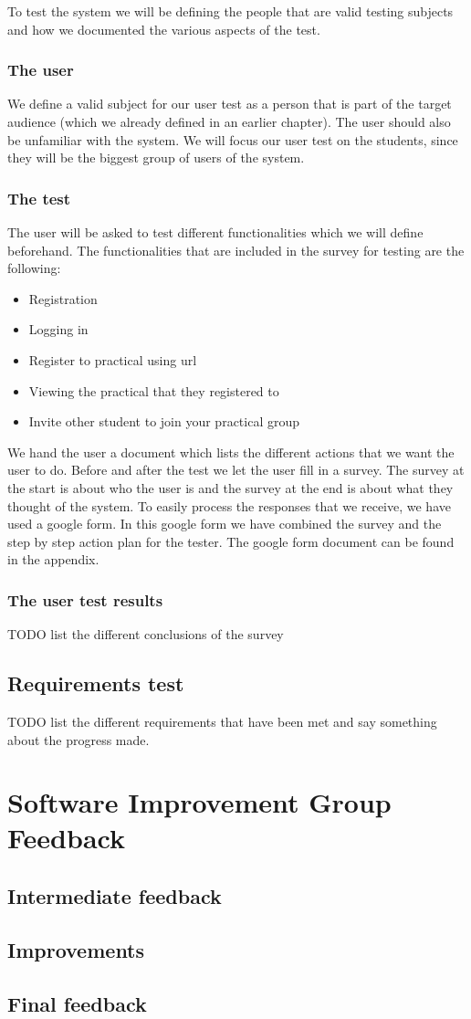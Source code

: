To test the system we will be defining the people that are valid testing subjects and how we documented the various aspects of the test.

\subsubsection{The user}
We define a valid subject for our user test as a person that is part of the target audience (which we already defined in an earlier chapter).
The user should also be unfamiliar with the system.
We will focus our user test on the students, since they will be the biggest group of users of the system.

\subsubsection{The test}
The user will be asked to test different functionalities which we will define beforehand.
The functionalities that are included in the survey for testing are the following:
\begin{itemize}
\item Registration
\item Logging in
\item Register to practical using url
\item Viewing the practical that they registered to
\item Invite other student to join your practical group
\end{itemize}
We hand the user a document which lists the different actions that we want the user to do.
Before and after the test we let the user fill in a survey.
The survey at the start is about who the user is and the survey at the end is about what they thought of the system.
To easily process the responses that we receive, we have used a google form.
In this google form we have combined the survey and the step by step action plan for the tester.
The google form document can be found in the appendix.


\subsubsection{The user test results}
TODO list the different conclusions of the survey

\subsection{Requirements test}
TODO list the different requirements that have been met and say something about the progress made.

\section{Software Improvement Group Feedback}
\subsection{Intermediate feedback}
\subsection{Improvements}
\subsection{Final feedback}


